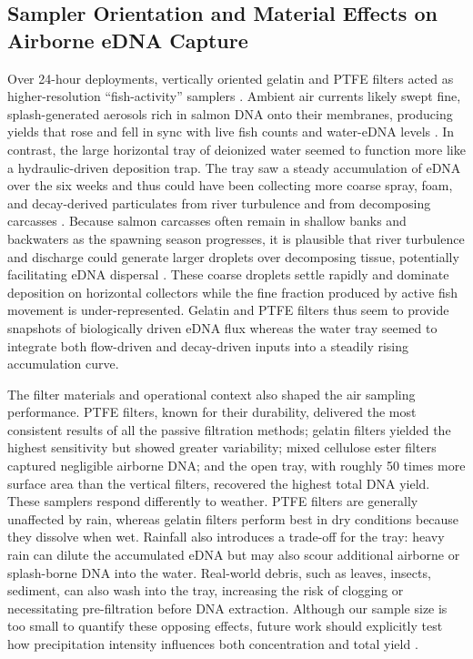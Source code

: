\documentclass{article}
\begin{document}
\subsection{Sampler Orientation and Material Effects on Airborne eDNA Capture}
Over 24-hour deployments, vertically oriented gelatin and PTFE filters acted as higher-resolution “fish-activity” samplers \cite{jager2025}. Ambient air currents likely swept fine, splash-generated aerosols rich in salmon DNA onto their membranes, producing yields that rose and fell in sync with live fish counts and water-eDNA levels \cite{blanchard1980}. In contrast, the large horizontal tray of deionized water seemed to function more like a hydraulic-driven deposition trap. The tray saw a steady accumulation of eDNA over the six weeks and thus could have been collecting more coarse spray, foam, and decay-derived particulates from river turbulence and from decomposing carcasses \cite{hinds2022,prather2013}. Because salmon carcasses often remain in shallow banks and backwaters as the spawning season progresses, it is plausible that river turbulence and discharge could generate larger droplets over decomposing tissue, potentially facilitating eDNA dispersal \cite{wood2021,herman2023}. These coarse droplets settle rapidly and dominate deposition on horizontal collectors while the fine fraction produced by active fish movement is under-represented. Gelatin and PTFE filters thus seem to provide snapshots of biologically driven eDNA flux whereas the water tray seemed to integrate both flow-driven and decay-driven inputs into a steadily rising accumulation curve.

The filter materials and operational context also shaped the air sampling performance. PTFE filters, known for their durability, delivered the most consistent results of all the passive filtration methods; gelatin filters yielded the highest sensitivity but showed greater variability; mixed cellulose ester filters captured negligible airborne DNA; and the open tray, with roughly 50 times more surface area than the vertical filters, recovered the highest total DNA yield. These samplers respond differently to weather. PTFE filters are generally unaffected by rain, whereas gelatin filters perform best in dry conditions because they dissolve when wet. Rainfall also introduces a trade-off for the tray: heavy rain can dilute the accumulated eDNA but may also scour additional airborne or splash-borne DNA into the water. Real-world debris, such as leaves, insects, sediment, can also wash into the tray, increasing the risk of clogging or necessitating pre-filtration before DNA extraction. Although our sample size is too small to quantify these opposing effects, future work should explicitly test how precipitation intensity influences both concentration and total yield \cite{johnson2023}. 
\end{document}
